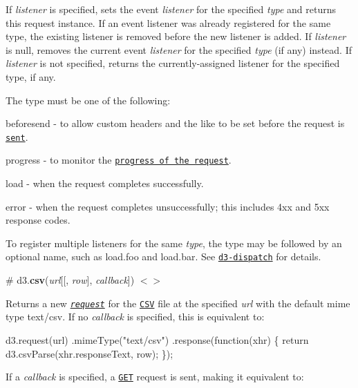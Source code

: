 If {\itshape listener} is specified, sets the event {\itshape listener} for the specified {\itshape type} and returns this request instance. If an event listener was already registered for the same type, the existing listener is removed before the new listener is added. If {\itshape listener} is null, removes the current event {\itshape listener} for the specified {\itshape type} (if any) instead. If {\itshape listener} is not specified, returns the currently-\/assigned listener for the specified type, if any.

The type must be one of the following\+:


\begin{DoxyItemize}
\item {\ttfamily beforesend} -\/ to allow custom headers and the like to be set before the request is \href{#request_send}{\tt sent}.
\item {\ttfamily progress} -\/ to monitor the \href{http://www.w3.org/TR/progress-events/}{\tt progress of the request}.
\item {\ttfamily load} -\/ when the request completes successfully.
\item {\ttfamily error} -\/ when the request completes unsuccessfully; this includes 4xx and 5xx response codes.
\end{DoxyItemize}

To register multiple listeners for the same {\itshape type}, the type may be followed by an optional name, such as {\ttfamily load.\+foo} and {\ttfamily load.\+bar}. See \href{https://github.com/d3/d3-dispatch}{\tt d3-\/dispatch} for details.

\label{_csv}%
\# d3.{\bfseries csv}({\itshape url}\mbox{[}\mbox{[}, {\itshape row}\mbox{]}, {\itshape callback}\mbox{]}) \href{https://github.com/d3/d3-request/blob/master/src/csv.js}{\tt $<$$>$}

Returns a new \href{#request}{\tt {\itshape request}} for the \href{https://github.com/d3/d3-dsv#csvParse}{\tt C\+SV} file at the specified {\itshape url} with the default mime type {\ttfamily text/csv}. If no {\itshape callback} is specified, this is equivalent to\+:


\begin{DoxyCode}
d3.request(url)
    .mimeType("text/csv")
    .response(function(xhr) \{ return d3.csvParse(xhr.responseText, row); \});
\end{DoxyCode}


If a {\itshape callback} is specified, a \href{#request_get}{\tt G\+ET} request is sent, making it equivalent to\+:


